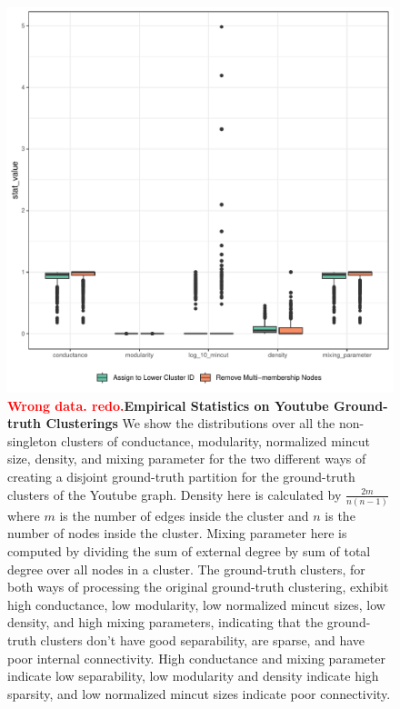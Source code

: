 \documentclass[aps,pre,superscriptaddress]{revtex4}
\begin{document}
\begin{figure}[!htpb]
\centering
\includegraphics[]{figures/youtube_ground_truth_stats.pdf}
\caption[]{\textbf{\textcolor{red}{Wrong data. redo.}Empirical Statistics on Youtube Ground-truth Clusterings} We show the distributions over all the non-singleton clusters of conductance, modularity, normalized mincut size, density, and mixing parameter for the two different ways of creating a disjoint ground-truth partition for the ground-truth clusters of the Youtube graph. Density here is calculated by $\frac{2m}{n(n-1)}$ where $m$ is the number of edges inside the cluster and $n$ is the number of nodes inside the cluster. Mixing parameter here is computed by dividing the sum of external degree by sum of total degree over all nodes in a cluster. The ground-truth clusters, for both ways of processing the original ground-truth clustering, exhibit high conductance, low modularity, low normalized mincut sizes, low density, and high mixing parameters, indicating that the ground-truth clusters don't have good separability, are sparse, and have poor internal connectivity. High conductance and mixing parameter indicate low separability, low modularity and density indicate high sparsity, and low normalized mincut sizes indicate poor connectivity.}
\label{fig:youtube-ground-truth-stats}
\end{figure}
\end{document}

